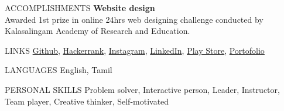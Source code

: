 \documentclass{template}
\begin{document}
\begin{rSection}{ACCOMPLISHMENTS}
\textbf{Website design} \\
Awarded 1st prize in online 24hrs web designing challenge conducted by Kalasalingam Academy of Research and Education.

%
%

\end{rSection}

\begin{rSection}{LINKS}
\href{https://github.com/princesanjivy}{Github},
\href{https://www.hackerrank.com/profile/sanjivy_android}{Hackerrank},
\href{https://www.instagram.com/princesanjivy}{Instagram},
\href{https://www.linkedin.com/in/sanjivy-kumaravel-1bb99a173}{LinkedIn},
\href{https://play.google.com/store/apps/dev?id=6439925551269057866}{Play Store},
\href{https://princesanjivy-portfolio.web.app/}{Portofolio}

\end{rSection}

\begin{rSection}{LANGUAGES}
English, Tamil

\end{rSection}

\begin{rSection}{PERSONAL SKILLS}
Problem solver, Interactive person, Leader, Instructor, Team player, Creative thinker,  Self-motivated

\end{rSection}
\end{document}
